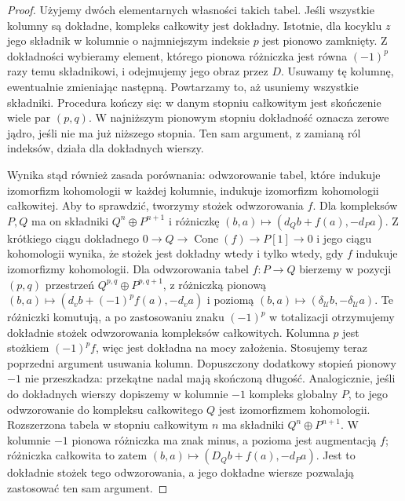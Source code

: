 \begin{proof}
Użyjemy dwóch elementarnych własności takich tabel.
Jeśli wszystkie kolumny są dokładne, kompleks całkowity
jest dokładny. Istotnie, dla kocyklu $z$ jego składnik
w kolumnie o najmniejszym indeksie $p$ jest pionowo
zamknięty. Z dokładności wybieramy element, którego pionowa
różniczka jest równa $(-1)^p$ razy temu składnikowi,
i odejmujemy jego obraz przez $D$.
Usuwamy tę kolumnę, ewentualnie zmieniając następną.
Powtarzamy to, aż usuniemy wszystkie składniki.
Procedura kończy się: w danym stopniu całkowitym jest
skończenie wiele par $(p,q)$. W najniższym pionowym
stopniu dokładność oznacza zerowe jądro, jeśli nie ma
już niższego stopnia. Ten sam argument, z zamianą
ról indeksów, działa dla dokładnych wierszy.

Wynika stąd również zasada porównania: odwzorowanie
tabel, które indukuje izomorfizm kohomologii w każdej
kolumnie, indukuje izomorfizm kohomologii całkowitej.
Aby to sprawdzić, tworzymy stożek odwzorowania $f$.
Dla kompleksów $P,Q$ ma on składniki
$Q^n\oplus P^{n+1}$ i różniczkę
$(b,a)\mapsto(d_Qb+f(a),-d_Pa)$.
Z krótkiego ciągu dokładnego
$0\to Q\to\operatorname{Cone}(f)\to P[1]\to0$
i jego ciągu kohomologii wynika, że stożek jest dokładny
wtedy i tylko wtedy, gdy $f$ indukuje izomorfizmy
kohomologii. Dla odwzorowania tabel $f:P\to Q$ bierzemy
w pozycji $(p,q)$ przestrzeń $Q^{p,q}\oplus P^{p,q+1}$,
z różniczką pionową
$(b,a)\mapsto(d_vb+(-1)^p f(a),-d_va)$
i poziomą $(b,a)\mapsto(\delta_{\mathcal U}b,-\delta_{\mathcal U}a)$.
Te różniczki komutują, a po zastosowaniu znaku $(-1)^p$
w totalizacji otrzymujemy dokładnie stożek odwzorowania
kompleksów całkowitych. Kolumna $p$ jest stożkiem
$(-1)^p f$, więc jest dokładna na mocy założenia.
Stosujemy teraz poprzedni argument usuwania kolumn.
Dopuszczony dodatkowy stopień pionowy $-1$ nie przeszkadza:
przekątne nadal mają skończoną długość. Analogicznie,
jeśli do dokładnych wierszy dopiszemy w kolumnie $-1$
kompleks globalny $P$, to jego odwzorowanie do kompleksu
całkowitego $Q$ jest izomorfizmem kohomologii.
Rozszerzona tabela w stopniu całkowitym $n$ ma składniki
$Q^n\oplus P^{n+1}$. W kolumnie $-1$ pionowa różniczka
ma znak minus, a pozioma jest augmentacją $f$;
różniczka całkowita to zatem
$(b,a)\mapsto(D_Qb+f(a),-d_Pa)$.
Jest to dokładnie stożek tego odwzorowania, a jego
dokładne wiersze pozwalają zastosować ten sam argument.


\end{proof}
